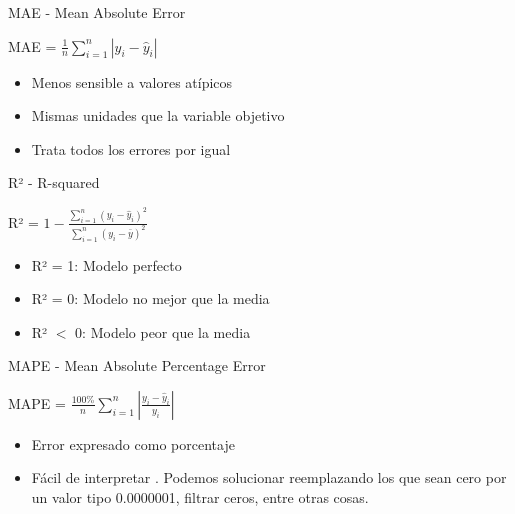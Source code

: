 \documentclass{beamer}
\begin{document}
\begin{frame}{MAE - Mean Absolute Error}
    \begin{center}
        \Large MAE = $\frac{1}{n} \sum_{i=1}^{n} |y_i - \hat{y}_i|$
    \end{center}
    
    \begin{itemize}
        \item Menos sensible a valores atípicos
        \item Mismas unidades que la variable objetivo
        \item Trata todos los errores por igual
    \end{itemize}
\end{frame}

\begin{frame}{R² - R-squared}
    \begin{center}
        \Large R² = $1 - \frac{\sum_{i=1}^{n} {(y_i - \hat{y}_i)}^2}{\sum_{i=1}^{n} {(y_i - \bar{y})}^2}$
    \end{center}
    
    \begin{itemize}
        \item R² = 1: Modelo perfecto
        \item R² = 0: Modelo no mejor que la media
        \item R² $<$ 0: Modelo peor que la media
    \end{itemize}
\end{frame}

\begin{frame}{MAPE - Mean Absolute Percentage Error}
    \begin{center}
        \Large MAPE = $\frac{100\%}{n} \sum_{i=1}^{n} \left|\frac{y_i - \hat{y}_i}{y_i}\right|$
    \end{center}
    
    \begin{itemize}
        \item Error expresado como porcentaje
        \item Fácil de interpretar
        . Podemos solucionar reemplazando los que sean cero por un valor tipo 0.0000001, filtrar ceros, entre otras cosas.
    \end{itemize}
\end{frame}
\end{document}
